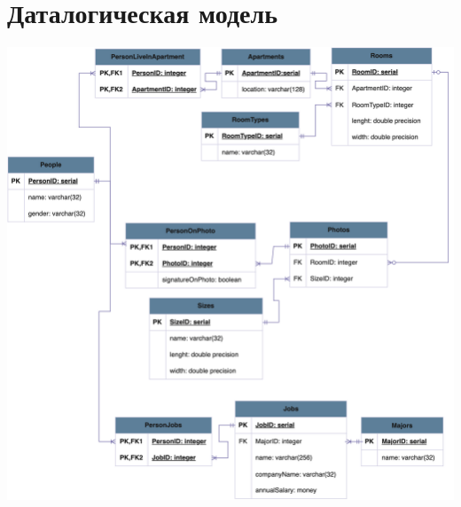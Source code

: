\documentclass[12pt,onecolumn]{article}
\begin{document}
\section{Даталогическая модель}
\includegraphics[width=\textwidth]{image/datalogical-model.png}
\end{document}
